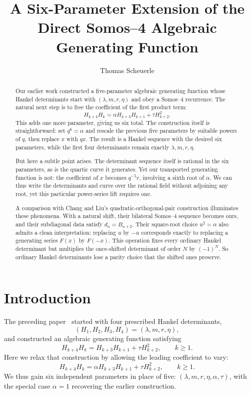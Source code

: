 \documentclass[11pt]{article}
\title{A Six-Parameter Extension of the\\
Direct Somos--4 Algebraic Generating Function}
\author{Thomas Scheuerle}
\date{}
\theoremstyle{definition}
\theoremstyle{remark}
\begin{document}
\maketitle

\begin{abstract}
Our earlier work constructed a five-parameter algebraic generating function
whose Hankel determinants start with $(\lambda,m,r,\eta)$ and obey a Somos--4
recurrence. The natural next step is to free the coefficient of the first
product term:
\[
 H_{k+4}H_k=\alpha H_{k+3}H_{k+1}+\tau H_{k+2}^2.
\]
This adds one more parameter, giving us six total. The construction itself is
straightforward: set $q^6=\alpha$ and rescale the previous five parameters by
suitable powers of $q$, then replace $x$ with $qx$. The result is a Hankel
sequence with the desired six parameters, while the first four determinants
remain exactly $\lambda, m, r, \eta$.

But here a subtle point arises. The determinant sequence itself is rational in
the six parameters, as is the quartic curve it generates. Yet our transported
generating function is not: the coefficient of $x$ becomes $q^{-5}r$, involving
a sixth root of $\alpha$. We can thus write the determinants and curve over the
rational field without adjoining any root, yet this particular power-series lift
requires one.

A comparison with Chang and Liu's quadratic-orthogonal-pair construction
illuminates these phenomena. With a natural shift, their bilateral Somos--4
sequence becomes ours, and their subdiagonal data satisfy $d_n=B_{n+2}$. Their
square-root choice $u^2=\alpha$ also admits a clean interpretation: replacing
$u$ by $-u$ corresponds exactly to replacing a generating series $F(x)$ by
$F(-x)$. This operation fixes every ordinary Hankel determinant but multiplies
the once-shifted determinant of order $N$ by $(-1)^N$. So ordinary Hankel
determinants lose a parity choice that the shifted ones preserve.
\end{abstract}

\section{Introduction}
The preceding paper~\cite{Scheuerle2026} started with four prescribed Hankel
determinants,
\[
 (H_1,H_2,H_3,H_4)=(\lambda,m,r,\eta),
\]
and constructed an algebraic generating function satisfying
\begin{equation}
 H_{k+4}H_k=H_{k+3}H_{k+1}+\tau H_{k+2}^2,
 \qquad k\geq1.
 \label{eq:old-somos4}
\end{equation}
Here we relax that construction by allowing the leading coefficient to vary:
\begin{equation}
 H_{k+4}H_k=\alpha H_{k+3}H_{k+1}+\tau H_{k+2}^2,
 \qquad k\geq1.
 \label{eq:new-somos4}
\end{equation}
We thus gain six independent parameters in place of five: $(\lambda,m,r,\eta,\alpha,\tau)$, with the special case $\alpha=1$ recovering the earlier construction.
\end{document}
